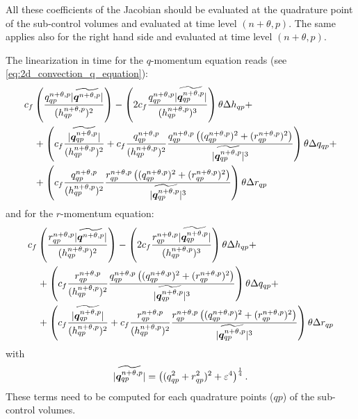 All these coefficients of the Jacobian should be evaluated at the quadrature point of the sub-control volumes and evaluated at time level $(n+\theta,p)$.
The same applies also for the right hand side and evaluated at time level $(n+\theta,p)$.

The linearization in time for the $q$-momentum equation reads (see \autoref{eq:2d_convection_q_equation}):
\begin{align}
        &c_f \left( \frac{q^{n+\theta,p}_{qp}\lvert \widetilde{\bm{q}^{n+\theta,p}} \rvert}{(h^{n+\theta,p}_{qp})^2} \right)
        - \left( 2 c_f \frac{ q^{n+\theta,p}_{qp} \lvert \widetilde{\bm{q}^{n+\theta,p}_{qp}} \rvert }{(h^{n+\theta,p}_{qp})^3} \right) \theta \Delta h_{qp} +
        \\*
        & \quad +
        \left( c_f \frac{\lvert \widetilde{\bm{q}^{n+\theta,p}_{qp}} \rvert}{(h^{n+\theta,p}_{qp})^2}
        + c_f \frac{q^{n+\theta,p}_{qp}}{(h^{n+\theta,p}_{qp})^2} \frac{q^{n+\theta,p}_{qp}\left( (q^{n+\theta,p}_{qp})^2 + (r^{n+\theta,p}_{qp})^2 \right) }{\lvert \widetilde{\bm{q}^{n+\theta,p}_{qp}} \rvert^3} \right) \theta \Delta q_{qp} +
        \\*
        & \quad + \left( c_f \frac{q^{n+\theta,p}_{qp}}{(h^{n+\theta,p}_{qp})^2}
        \frac{ r^{n+\theta,p}_{qp} \left( (q^{n+\theta,p}_{qp})^2 + (r^{n+\theta,p}_{qp})^2  \right)}
        {\lvert \widetilde{\bm{q}^{n+\theta,p}_{qp}} \rvert^3 } \right) \theta \Delta r_{qp}
 \end{align}
and for the $r$-momentum equation:
\begin{align}
        &c_f \left( \frac{r^{n+\theta,p}_{qp}\lvert \widetilde{\bm{q}^{n+\theta,p}} \rvert}{(h^{n+\theta,p}_{qp})^2} \right)
        - \left( 2 c_f \frac{ r^{n+\theta,p}_{qp} \lvert \widetilde{\bm{q}^{n+\theta,p}_{qp}} \rvert} {(h^{n+\theta,p}_{qp})^3} \right) \theta \Delta h_{qp} +
        \\*
        & \quad + \left(
         c_f \frac{r^{n+\theta,p}_{qp}}{(h^{n+\theta,p}_{qp})^2}\frac{q^{n+\theta,p}_{qp}\left( (q^{n+\theta,p}_{qp})^2 + (r^{n+\theta,p}_{qp})^2 \right)}
        {\lvert \widetilde{\bm{q}^{n+\theta,p}_{qp}} \rvert^3 }
        \right) \theta \Delta q_{qp} +
        \\*
        &\quad + \left( c_f \frac{\lvert \widetilde{\bm{q}^{n+\theta,p}_{qp}} \rvert}{(h^{n+\theta,p}_{qp})^2}
        + c_f \frac{r^{n+\theta,p}_{qp}}{(h^{n+\theta,p}_{qp})^2} \frac{r^{n+\theta,p}_{qp}\left( (q^{n+\theta,p}_{qp})^2 + (r^{n+\theta,p}_{qp})^2 \right) }{\lvert \widetilde{\bm{q}^{n+\theta,p}_{qp}} \rvert^3}  \right) \theta \Delta r_{qp}
\end{align}
with
\begin{align}
    \lvert \widetilde{\bm{q}^{n+\theta,p}_{qp}} \rvert = \left( (q^2_{qp} + r^2_{qp})^2 + \varepsilon^4 \right)^{\frac{1}{4}}.
\end{align}
These terms need to be computed for each quadrature points ($qp$) of the sub-control volumes.
